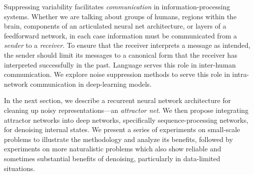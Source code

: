 \documentclass{article}
\begin{document}
%
%
%
%

Suppressing variability facilitates \emph{communication} in
information-processing systems. Whether we are talking about groups of humans,
regions within the brain, components of an articulated neural net
architecture, or layers of a feedforward network, in each case information must
be communicated from a \emph{sender} to a \emph{receiver}. To ensure that
the receiver interprets a message as intended, the sender should limit its
messages to a canonical form that the receiver has interpreted successfully 
in the past.  Language serves this role in inter-human communication. We 
explore noise suppression methods to serve this role in 
intra-network communication in deep-learning models.


In the next section, we describe a recurrent neural network architecture for
cleaning up noisy representations---an \emph{attractor net}. We then propose
integrating attractor networks into deep networks, specifically
sequence-processing networks, for denoising internal states.  We present a
series of experiments on small-scale problems to illustrate the methodology and
analyze its benefits, followed by experiments on more naturalistic problems
which also show reliable and sometimes substantial benefits of denoising,
particularly in data-limited situations.
\end{document}
